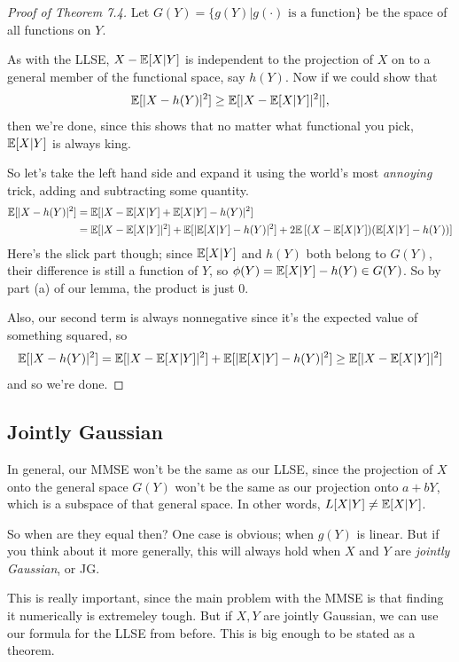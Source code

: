 \documentclass[11 pt]{scrartcl}
\begin{document}
\begin{proof}[Proof of Theorem 7.4]
    Let $G(Y) = \{ g(Y) | g(\cdot) \text{ is a function}\}$ be the space of all functions on $Y$. 

    As with the LLSE, $X - \mathbb E[X|Y]$ is independent to the projection of $X$ on to a general member of the functional space, say $h(Y)$. Now if we could show that 
    \[ \mathbb E[|X - h(Y)|^2] \geq \mathbb E[|X - \mathbb E[X|Y]|^2|],\] 
    then we're done, since this shows that no matter what functional you pick, $\mathbb E[X|Y]$ is always king. 

    So let's take the left hand side and expand it using the world's most \emph{annoying} trick, adding and subtracting some quantity. 
    \begin{align*}
        \mathbb E[|X - h(Y)|^2] &= \mathbb E[|X - \mathbb E[X|Y] + \mathbb E[X|Y] - h(Y)|^2] \\ 
                          &= \mathbb E[|X - \mathbb E[X|Y]|^2] + \mathbb E[|\mathbb E[X|Y] - h(Y)|^2] + 2\mathbb E\left[(X - \mathbb E[X|Y])(\mathbb E[X|Y] - h(Y))\right]
    \end{align*}
    Here's the slick part though; since $\mathbb E[X|Y]$ and $h(Y)$ both belong to $G(Y)$, their difference is still a function of $Y$, so $\phi(Y) = \mathbb E[X|Y] - h(Y) \in G(Y)$. So by part (a) of our lemma, the product is just 0.

    Also, our second term is always nonnegative since it's the expected value of something squared, so 
    \[ \mathbb E[|X - h(Y)|^2] = \mathbb E[|X - \mathbb E[X|Y]|^2] + \mathbb E[|\mathbb E[X|Y] - h(Y)|^2] \geq \mathbb E[|X - \mathbb E[X|Y]|^2] \] 
    and so we're done. 
\end{proof}

\subsection{Jointly Gaussian}
In general, our MMSE won't be the same as our LLSE, since the projection of $X$ onto the general space $G(Y)$ won't be the same as our projection onto $a + bY$, which is a subspace of that general space. In other words, $L[X|Y] \not= \mathbb E[X|Y]$. 

So when are they equal then? One case is obvious; when $g(Y)$ is linear. But if you think about it more generally, this will always hold when $X$ and $Y$ are \emph{jointly Gaussian}, or JG. 

This is really important, since the main problem with the MMSE is that finding it numerically is extremeley tough. But if $X,Y$ are jointly Gaussian, we can use our formula for the LLSE from before. This is big enough to be stated as a theorem. 
\end{document}
